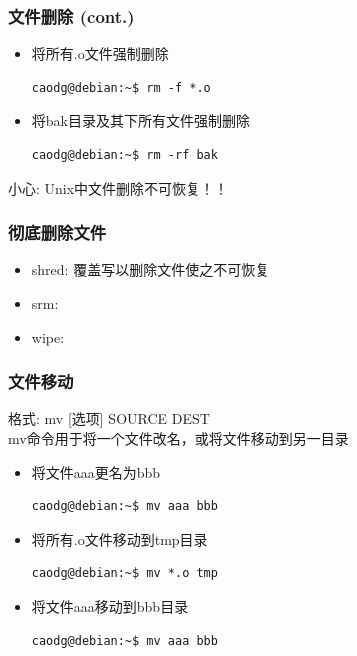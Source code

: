 \documentclass[compress]{beamer}
\begin{document}
\begin{frame}[containsverbatim]
  \frametitle{文件删除 (cont.)}

  \begin{itemize}
\item 将所有.o文件强制删除\\
\begin{Verbatim}
caodg@debian:~$ rm -f *.o
\end{Verbatim}

\item 将bak目录及其下所有文件强制删除\\
\begin{Verbatim}
caodg@debian:~$ rm -rf bak
\end{Verbatim}

\end{itemize}
小心: Unix中文件删除不可恢复！！


\end{frame}

\begin{frame}
    \frametitle{彻底删除文件}
    \begin{itemize}
        \item shred:  覆盖写以删除文件使之不可恢复
        \item srm:
        \item wipe:
    \end{itemize}
\end{frame}


\begin{frame}[containsverbatim]
\frametitle{文件移动}

格式: \alert{mv} [选项] SOURCE DEST \\
\alert{mv}命令用于将一个文件改名，或将文件移动到另一目录

\begin{itemize}
\item 将文件aaa更名为bbb\\
\begin{Verbatim}
caodg@debian:~$ mv aaa bbb
\end{Verbatim}

\item 将所有.o文件移动到tmp目录\\
\begin{Verbatim}
caodg@debian:~$ mv *.o tmp
\end{Verbatim}

\item 将文件aaa移动到bbb目录\\
\begin{Verbatim}
caodg@debian:~$ mv aaa bbb
\end{Verbatim}

\end{itemize}


\end{frame}
\end{document}
